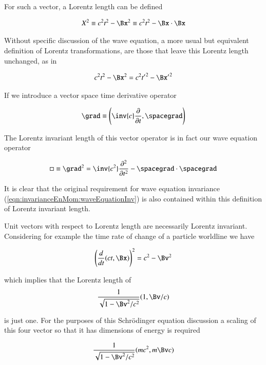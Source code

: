 \documentclass{article}
\begin{document}
For such a vector, a Lorentz length can be defined

\begin{align}
X^2 \equiv c^2 t^2 - \Bx^2 \equiv c^2 t^2 - \Bx \cdot \Bx
\end{align}

Without specific discussion of the wave equation, 
a more usual but equivalent definition of Lorentz transformations, are those that leave this
Lorentz length unchanged, as in

\begin{align}
c^2 t^2 - \Bx^2 = c^2 {t'}^2 - {\Bx'}^2 
\end{align}

If we introduce a vector space time derivative operator

\begin{align}
\grad \equiv \left(\inv{c}\frac{\partial}{\partial t}, \spacegrad \right)
\end{align}

The Lorentz invariant length of this vector operator is in fact our wave equation operator

\begin{align}
\square \equiv \grad^2 = \inv{c^2}\frac{\partial^2}{\partial t^2} - \spacegrad \cdot \spacegrad
\end{align}

It is clear that the original requirement for wave equation invariance (\ref{eqn:invarianceEnMom:waveEquationInv}) is also contained within 
this definition of Lorentz invariant length.

Unit vectors with respect to Lorentz length are necessarily Lorentz invariant.  Considering for example the time rate of change of
a particle worldline we have

\begin{align}
\left(\frac{d}{dt}(ct, \Bx) \right)^2 = c^2 - \Bv^2
\end{align}

which implies that the Lorentz length of
\begin{align}
\frac{1}{\sqrt{1 - \Bv^2/c^2}}(1, \Bv/c)
\end{align}

is just one.  For the purposes of this 
Schr\"{o}dinger equation
discussion a scaling of this four vector so that it has dimensions of energy is required

\begin{align}
\frac{1}{\sqrt{1 - \Bv^2/c^2}}(m c^2, m\Bv c)
\end{align}
\end{document}
